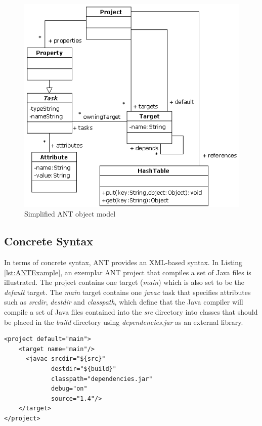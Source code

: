 \begin{figure}
	\centering
		\includegraphics{images/AntCore.png}
	\caption{Simplified ANT object model}
	\label{fig:AntCore}
\end{figure}

\subsection{Concrete Syntax}

In terms of concrete syntax, ANT provides an XML-based syntax. In Listing \ref{lst:ANTExample}, an exemplar ANT project that compiles a set of Java files is illustrated. The project contains one target (\emph{main}) which is also set to be the \emph{default} target. The \emph{main} target contains one \emph{javac} task that specifies attributes such as \emph{srcdir}, \emph{destdir} and \emph{classpath}, which define that the Java compiler will compile a set of Java files contained into the \emph{src} directory into classes that should be placed in the \emph{build} directory using \emph{dependencies.jar} as an external library.

\begin{lstlisting}[caption=Compiling Java classes using the javac task, label=lst:ANTExample]
<project default="main">
	<target name="main"/>
	  <javac srcdir="${src}"
	         destdir="${build}"
	         classpath="dependencies.jar"
	         debug="on"
	         source="1.4"/>
	</target>
</project>
\end{lstlisting}

